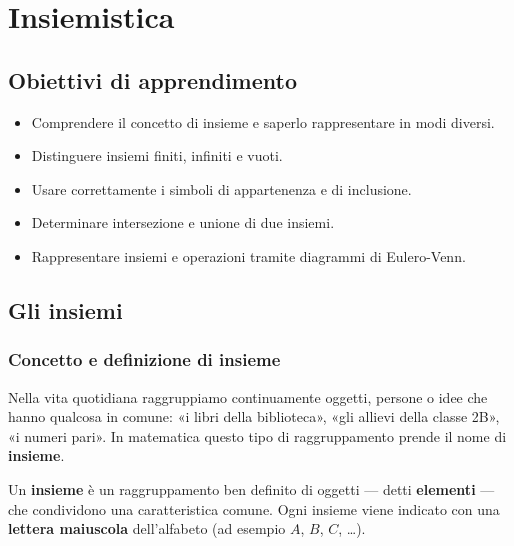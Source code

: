 
\chapter{Insiemistica}

\section*{Obiettivi di apprendimento}
\begin{itemize}[leftmargin=1.5em]
  \item Comprendere il concetto di insieme e saperlo rappresentare in modi diversi.
  \item Distinguere insiemi finiti, infiniti e vuoti.
  \item Usare correttamente i simboli di appartenenza e di inclusione.
  \item Determinare intersezione e unione di due insiemi.
  \item Rappresentare insiemi e operazioni tramite diagrammi di Eulero-Venn.
\end{itemize}

\section{Gli insiemi}

\subsection{Concetto e definizione di insieme}

Nella vita quotidiana raggruppiamo continuamente oggetti, persone o idee che hanno qualcosa in comune: «i libri della biblioteca», «gli allievi della classe 2B», «i numeri pari». In matematica questo tipo di raggruppamento prende il nome di \textbf{insieme}.

\begin{definizione}
Un \textbf{insieme} è un raggruppamento ben definito di oggetti — detti \textbf{elementi} — che condividono una caratteristica comune.
Ogni insieme viene indicato con una \textbf{lettera maiuscola} dell'alfabeto (ad esempio $A$, $B$, $C$, \ldots).
\end{definizione}

